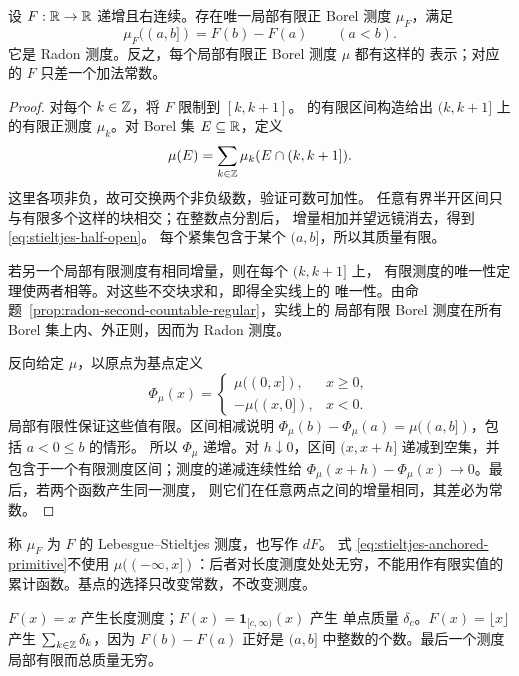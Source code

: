 \begin{theorem}
\label{thm:stieltjes-line-correspondence}
设 \(F:\mathbb{R}\to\mathbb{R}\) 递增且右连续。存在唯一局部有限正 Borel 测度
\(\mu_F\)，满足
\begin{equation}\label{eq:stieltjes-half-open}
 \mu_F((a,b])=F(b)-F(a)\qquad(a<b).
\end{equation}
它是 Radon 测度。反之，每个局部有限正 Borel 测度 \(\mu\) 都有这样的
表示；对应的 \(F\) 只差一个加法常数。
\end{theorem}
\begin{proof}
对每个 \(k\in\mathbb{Z}\)，将 \(F\) 限制到 \([k,k+1]\)。
的有限区间构造给出 \((k,k+1]\) 上
的有限正测度 \(\mu_k\)。对 Borel 集 \(E\subseteq\mathbb{R}\)，定义
\[
 \mu(E)=\sum_{k\in\mathbb{Z}}\mu_k(E\cap(k,k+1]).
\]
这里各项非负，故可交换两个非负级数，验证可数可加性。
任意有界半开区间只与有限多个这样的块相交；在整数点分割后，
增量相加并望远镜消去，得到 \eqref{eq:stieltjes-half-open}。
每个紧集包含于某个 \((a,b]\)，所以其质量有限。

若另一个局部有限测度有相同增量，则在每个 \((k,k+1]\) 上，
有限测度的唯一性定理使两者相等。对这些不交块求和，即得全实线上的
唯一性。由命题~\ref{prop:radon-second-countable-regular}，实线上的
局部有限 Borel 测度在所有 Borel 集上内、外正则，因而为 Radon 测度。

反向给定 \(\mu\)，以原点为基点定义
\begin{equation}\label{eq:stieltjes-anchored-primitive}
 \Phi_\mu(x)=
 \begin{cases}
   \mu((0,x]),&x\ge0,\\
   -\mu((x,0]),&x<0.
 \end{cases}
\end{equation}
局部有限性保证这些值有限。区间相减说明
\(\Phi_\mu(b)-\Phi_\mu(a)=\mu((a,b])\)，包括 \(a<0\le b\) 的情形。
所以 \(\Phi_\mu\) 递增。对 \(h\downarrow0\)，区间 \((x,x+h]\)
递减到空集，并包含于一个有限测度区间；测度的递减连续性给
\(\Phi_\mu(x+h)-\Phi_\mu(x)\to0\)。最后，若两个函数产生同一测度，
则它们在任意两点之间的增量相同，其差必为常数。
\end{proof}

称 \(\mu_F\) 为 \(F\) 的 Lebesgue--Stieltjes 测度，也写作 \(dF\)。
式 \eqref{eq:stieltjes-anchored-primitive}不使用
\(\mu(({-\infty},x])\)：后者对长度测度处处无穷，不能用作有限实值的
累计函数。基点的选择只改变常数，不改变测度。

\begin{example}
\(F(x)=x\) 产生长度测度；\(F(x)=\mathbf1_{[c,\infty)}(x)\) 产生
单点质量 \(\delta_c\)。\(F(x)=\lfloor x\rfloor\) 产生
\(\sum_{k\in\mathbb{Z}}\delta_k\)，因为 \(F(b)-F(a)\) 正好是 \((a,b]\)
中整数的个数。最后一个测度局部有限而总质量无穷。
\end{example}

